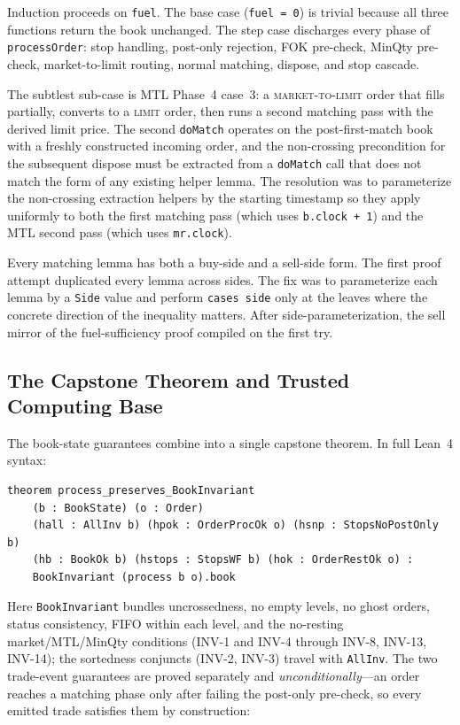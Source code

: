 \documentclass[11pt,a4paper]{article}
\begin{document}
Induction proceeds on \texttt{fuel}. The base case (\texttt{fuel = 0})
is trivial because all three functions return the book unchanged. The
step case discharges every phase of \texttt{processOrder}: stop
handling, post-only rejection, FOK pre-check, MinQty pre-check,
market-to-limit routing, normal matching, dispose, and stop cascade.

The subtlest sub-case is MTL Phase~4 case~3: a
\textsc{market-to-limit} order that fills partially, converts to a
\textsc{limit} order, then runs a second matching pass with the derived
limit price. The second \texttt{doMatch} operates on the post-first-match
book with a freshly constructed incoming order, and the non-crossing
precondition for the subsequent dispose must be extracted from a
\texttt{doMatch} call that does not match the form of any existing
helper lemma. The resolution was to parameterize the non-crossing
extraction helpers by the starting timestamp so they apply uniformly to
both the first matching pass (which uses \texttt{b.clock + 1}) and the
MTL second pass (which uses \texttt{mr.clock}).

Every matching lemma has both a buy-side and a sell-side form. The first
proof attempt duplicated every lemma across sides. The fix was to
parameterize each lemma by a \texttt{Side} value and perform
\texttt{cases side} only at the leaves where the concrete direction of
the inequality matters. After side-parameterization, the sell mirror of
the fuel-sufficiency proof compiled on the first try.

\subsection{The Capstone Theorem and Trusted Computing Base}
\label{sec:capstone-tcb}

The book-state guarantees combine into a single capstone theorem. In
full Lean~4 syntax:

\begin{lstlisting}[language={},basicstyle=\ttfamily\footnotesize]
theorem process_preserves_BookInvariant
    (b : BookState) (o : Order)
    (hall : AllInv b) (hpok : OrderProcOk o) (hsnp : StopsNoPostOnly b)
    (hb : BookOk b) (hstops : StopsWF b) (hok : OrderRestOk o) :
    BookInvariant (process b o).book
\end{lstlisting}

\noindent Here \texttt{BookInvariant} bundles uncrossedness, no empty
levels, no ghost orders, status consistency, FIFO within each level, and
the no-resting market/MTL/MinQty conditions (INV-1 and INV-4 through
INV-8, INV-13, INV-14); the sortedness conjuncts (INV-2, INV-3) travel
with \texttt{AllInv}. The two trade-event guarantees are proved
separately and \emph{unconditionally}---an order reaches a matching
phase only after failing the post-only pre-check, so every emitted trade
satisfies them by construction:
\end{document}
